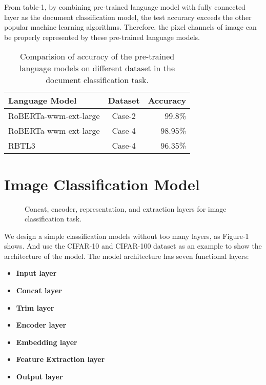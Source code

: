 \documentclass[review]{cvpr}
\begin{document}
\par From table-1, by combining pre-trained language model with fully connected layer as the document classification model,
the test accuracy exceeds the other popular machine learning algorithms.
Therefore, the pixel channels of image can be properly represented by these pre-trained language models.

\begin{table}
\begin{center}
\begin{tabular}{|l|c|r|}
\hline
Language Model 	& Dataset & Accuracy \\
\hline\hline
RoBERTa-wwm-ext-large & Case-2	&	99.8\% \\
RoBERTa-wwm-ext-large & Case-4	&	98.95\% \\
RBTL3  & Case-4	&	96.35\% \\
\hline
\end{tabular}
\end{center}
\caption{Comparision of accuracy of the pre-trained language models on different dataset in the document classification task.}
\end{table}


\section{Image Classification Model}

\begin{figure*}
\begin{center}
\end{center}
   \caption{Concat, encoder, representation, and extraction layers for image classification task.}
\label{fig:short}
\end{figure*}

We design a simple classification models without too many layers, as Figure-1 shows.
And use the CIFAR-10 and CIFAR-100 dataset as an example to show the architecture of the model.
The model architecture has seven functional layers:
\begin{itemize}
\item {\bf Input layer}
\item {\bf Concat layer}
\item {\bf Trim layer}
\item {\bf Encoder layer}
\item {\bf Embedding layer}
\item {\bf Feature Extraction layer}
\item {\bf Output layer}
\end{itemize}
\end{document}
